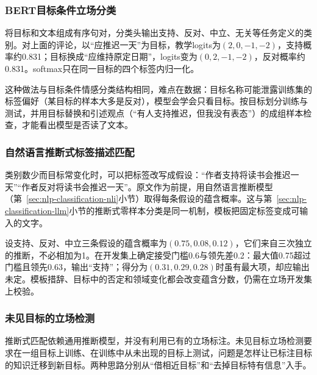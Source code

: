 \subsubsection{BERT目标条件立场分类}
\label{sec:nlp-classification-stance-bert}

将目标和文本组成有序句对，分类头输出支持、反对、中立、无关等任务定义的类别。对上面的评论，以“应推迟一天”为目标，教学logits为$(2,0,-1,-2)$，支持概率约0.831；目标换成“应维持原定日期”，logits变为$(0,2,-1,-2)$，反对概率约0.831。softmax只在同一目标的四个标签内归一化。

这种做法与目标条件情感分类结构相同，难点在数据：目标名称可能泄露训练集的标签偏好（某目标的样本大多是反对），模型会学会只看目标。按目标划分训练与测试，并用目标替换和引述观点（“有人支持推迟，但我没有表态”）的成组样本检查，才能看出模型是否读了文本。

\subsubsection{自然语言推断式标签描述匹配}
\label{sec:nlp-classification-stance-nli}

类别数少而目标常变化时，可以把标签改写成假设：“作者支持将读书会推迟一天”“作者反对将读书会推迟一天”。原文作为前提，用自然语言推断模型（第~\ref{sec:nlp-classification-nli}小节）取得每条假设的蕴含概率。这与第~\ref{sec:nlp-classification-llm}小节的推断式零样本分类是同一机制，模板把固定标签变成可输入的文字。

设支持、反对、中立三条假设的蕴含概率为$(0.75,0.08,0.12)$，它们来自三次独立的推断，不必相加为1。在开发集上确定接受门槛0.6与领先差0.2：最大值0.75超过门槛且领先0.63，输出“支持”；得分为$(0.31,0.29,0.28)$时虽有最大项，却应输出未定。模板措辞、目标中的否定和领域变化都会改变蕴含分数，仍需在立场开发集上校验。

\subsubsection{未见目标的立场检测}
\label{sec:nlp-classification-stance-zeroshot}

推断式匹配依赖通用推断模型，并没有利用已有的立场标注。未见目标立场检测要求在一组目标上训练、在训练中从未出现的目标上测试，问题是怎样让已标注目标的知识迁移到新目标。两种思路分别从“借相近目标”和“去掉目标特有信息”入手。

